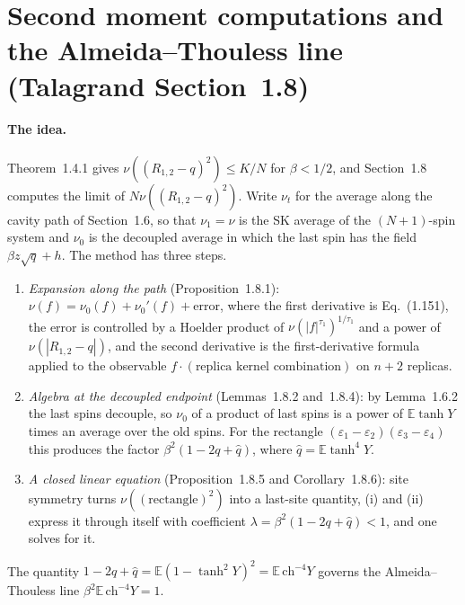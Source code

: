 \section{Second moment computations and the Almeida--Thouless line (Talagrand Section~1.8)}
\label{sec:sg-tal:second-moment}

\paragraph{The idea.}
Theorem~1.4.1 gives $\nu((R_{1,2}-q)^2)\le K/N$ for $\beta<1/2$, and Section~1.8 computes the limit of $N\nu((R_{1,2}-q)^2)$.
Write $\nu_t$ for the average along the cavity path of Section~1.6, so that $\nu_1=\nu$ is the SK average of the $(N+1)$-spin system and $\nu_0$ is the decoupled average in which the last spin has the field $\beta z\sqrt q+h$.
The method has three steps.
\begin{enumerate}
\item[(i)] \emph{Expansion along the path} (Proposition~1.8.1): $\nu(f)=\nu_0(f)+\nu_0'(f)+\text{error}$, where the first derivative is Eq.~(1.151), the error is controlled by a Hoelder product of $\nu(|f|^{\tau_1})^{1/\tau_1}$ and a power of $\nu(|R_{1,2}-q|)$, and the second derivative is the first-derivative formula applied to the observable $f\cdot(\text{replica kernel combination})$ on $n+2$ replicas.
\item[(ii)] \emph{Algebra at the decoupled endpoint} (Lemmas~1.8.2 and~1.8.4): by Lemma~1.6.2 the last spins decouple, so $\nu_0$ of a product of last spins is a power of $\mathbb E\tanh Y$ times an average over the old spins.  For the rectangle $(\varepsilon_1-\varepsilon_2)(\varepsilon_3-\varepsilon_4)$ this produces the factor $\beta^2(1-2q+\hat q)$, where $\hat q=\mathbb E\tanh^4Y$.
\item[(iii)] \emph{A closed linear equation} (Proposition~1.8.5 and Corollary~1.8.6): site symmetry turns $\nu((\text{rectangle})^2)$ into a last-site quantity, (i) and (ii) express it through itself with coefficient $\lambda=\beta^2(1-2q+\hat q)<1$, and one solves for it.
\end{enumerate}
The quantity $1-2q+\hat q=\mathbb E(1-\tanh^2Y)^2=\mathbb E\,\mathrm{ch}^{-4}Y$ governs the Almeida--Thouless line $\beta^2\mathbb E\,\mathrm{ch}^{-4}Y=1$.

